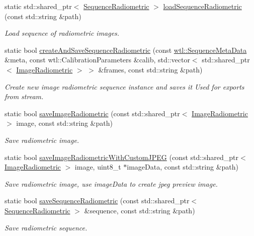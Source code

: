 \begin{DoxyCompactItemize}
static std\+::shared\+\_\+ptr$<$ \hyperlink{classwtl_1_1_sequence_radiometric}{Sequence\+Radiometric} $>$ \hyperlink{classwtl_1_1_center_aaf1b3d48079c2379413b3646914850a1}{load\+Sequence\+Radiometric} (const std\+::string \&path)
\begin{DoxyCompactList}\small\item\em Load sequence of radiometric images. \end{DoxyCompactList}\item 
static bool \hyperlink{classwtl_1_1_center_a9494acba7d102a614a4d503958df1e80}{create\+And\+Save\+Sequence\+Radiometric} (const \hyperlink{classwtl_1_1_sequence_meta_data}{wtl\+::\+Sequence\+Meta\+Data} \&meta, const wtl\+::\+Calibration\+Parameters \&calib, std\+::vector$<$ std\+::shared\+\_\+ptr$<$ \hyperlink{classwtl_1_1_image_radiometric}{Image\+Radiometric} $>$ $>$ \&frames, const std\+::string \&path)
\begin{DoxyCompactList}\small\item\em Create new image radiometric sequence instance and saves it Used for exports from stream. \end{DoxyCompactList}\item 
static bool \hyperlink{classwtl_1_1_center_aad7de1457ee843a617a566fe98b2e936}{save\+Image\+Radiometric} (const std\+::shared\+\_\+ptr$<$ \hyperlink{classwtl_1_1_image_radiometric}{Image\+Radiometric} $>$ image, const std\+::string \&path)
\begin{DoxyCompactList}\small\item\em Save radiometric image. \end{DoxyCompactList}\item 
static bool \hyperlink{classwtl_1_1_center_a118cac736e89810ff0b62e46d0445caf}{save\+Image\+Radiometric\+With\+Custom\+J\+P\+EG} (const std\+::shared\+\_\+ptr$<$ \hyperlink{classwtl_1_1_image_radiometric}{Image\+Radiometric} $>$ image, uint8\+\_\+t $\ast$image\+Data, const std\+::string \&path)
\begin{DoxyCompactList}\small\item\em Save radiometric image, use image\+Data to create jpeg preview image. \end{DoxyCompactList}\item 
static bool \hyperlink{classwtl_1_1_center_aedac729101013f723ec378ce4961ccb0}{save\+Sequence\+Radiometric} (const std\+::shared\+\_\+ptr$<$ \hyperlink{classwtl_1_1_sequence_radiometric}{Sequence\+Radiometric} $>$ \&sequence, const std\+::string \&path)
\begin{DoxyCompactList}\small\item\em Save radiometric sequence. \end{DoxyCompactList}\item 

\end{DoxyCompactItemize}
